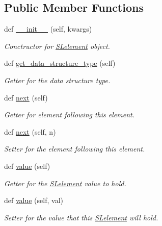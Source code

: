 \subsection*{Public Member Functions}
\begin{DoxyCompactItemize}
\item 
def \hyperlink{classbridges_1_1sl__element_1_1_s_lelement_af95c000aa951fbf1c5912892248389d2}{\+\_\+\+\_\+init\+\_\+\+\_\+} (self, kwargs)
\begin{DoxyCompactList}\small\item\em Conctructor for \hyperlink{classbridges_1_1sl__element_1_1_s_lelement}{S\+Lelement} object. \end{DoxyCompactList}\item 
def \hyperlink{classbridges_1_1sl__element_1_1_s_lelement_aa39835634a95d832d092dd3c057a49cf}{get\+\_\+data\+\_\+structure\+\_\+type} (self)
\begin{DoxyCompactList}\small\item\em Getter for the data structure type. \end{DoxyCompactList}\item 
def \hyperlink{classbridges_1_1sl__element_1_1_s_lelement_acef793fc5e2533fb91795d01904e8b6d}{next} (self)
\begin{DoxyCompactList}\small\item\em Getter for element following this element. \end{DoxyCompactList}\item 
def \hyperlink{classbridges_1_1sl__element_1_1_s_lelement_af7cdff0e4a93e1fbbcb7f92741fe4c7b}{next} (self, n)
\begin{DoxyCompactList}\small\item\em Setter for the element following this element. \end{DoxyCompactList}\item 
def \hyperlink{classbridges_1_1sl__element_1_1_s_lelement_a64ede02c56a4efaaa4c64a245bd01dd0}{value} (self)
\begin{DoxyCompactList}\small\item\em Getter for the \hyperlink{classbridges_1_1sl__element_1_1_s_lelement}{S\+Lelement} value to hold. \end{DoxyCompactList}\item 
def \hyperlink{classbridges_1_1sl__element_1_1_s_lelement_a7653b41a8bc2c8ba7a71f07c8b0b8f3f}{value} (self, val)
\begin{DoxyCompactList}\small\item\em Setter for the value that this \hyperlink{classbridges_1_1sl__element_1_1_s_lelement}{S\+Lelement} will hold. \end{DoxyCompactList}\item 

\end{DoxyCompactItemize}
